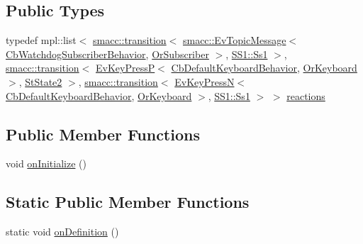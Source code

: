 \subsection*{Public Types}
\begin{DoxyCompactItemize}
\item 
typedef mpl\+::list$<$ \hyperlink{classsmacc_1_1transition}{smacc\+::transition}$<$ \hyperlink{structsmacc_1_1EvTopicMessage}{smacc\+::\+Ev\+Topic\+Message}$<$ \hyperlink{classsm__three__some_1_1cl__subscriber_1_1CbWatchdogSubscriberBehavior}{Cb\+Watchdog\+Subscriber\+Behavior}, \hyperlink{classsm__three__some_1_1OrSubscriber}{Or\+Subscriber} $>$, \hyperlink{structsm__three__some_1_1SS1_1_1Ss1}{S\+S1\+::\+Ss1} $>$, \hyperlink{classsmacc_1_1transition}{smacc\+::transition}$<$ \hyperlink{structsm__three__some_1_1cl__keyboard_1_1EvKeyPressP}{Ev\+Key\+PressP}$<$ \hyperlink{classsm__three__some_1_1cl__keyboard_1_1CbDefaultKeyboardBehavior}{Cb\+Default\+Keyboard\+Behavior}, \hyperlink{classsm__three__some_1_1OrKeyboard}{Or\+Keyboard} $>$, \hyperlink{structsm__three__some_1_1StState2}{St\+State2} $>$, \hyperlink{classsmacc_1_1transition}{smacc\+::transition}$<$ \hyperlink{structsm__three__some_1_1cl__keyboard_1_1EvKeyPressN}{Ev\+Key\+PressN}$<$ \hyperlink{classsm__three__some_1_1cl__keyboard_1_1CbDefaultKeyboardBehavior}{Cb\+Default\+Keyboard\+Behavior}, \hyperlink{classsm__three__some_1_1OrKeyboard}{Or\+Keyboard} $>$, \hyperlink{structsm__three__some_1_1SS1_1_1Ss1}{S\+S1\+::\+Ss1} $>$ $>$ \hyperlink{structsm__three__some_1_1StState3_a4136eb83635553c4ccc8ab0ca217a8f2}{reactions}
\end{DoxyCompactItemize}
\subsection*{Public Member Functions}
\begin{DoxyCompactItemize}
\item 
void \hyperlink{structsm__three__some_1_1StState3_a1828977fe52a7d68ba2368517927b1d9}{on\+Initialize} ()
\end{DoxyCompactItemize}
\subsection*{Static Public Member Functions}
\begin{DoxyCompactItemize}
\item 
static void \hyperlink{structsm__three__some_1_1StState3_abed2f14f5f5e3f039797d520442cb389}{on\+Definition} ()
\end{DoxyCompactItemize}
